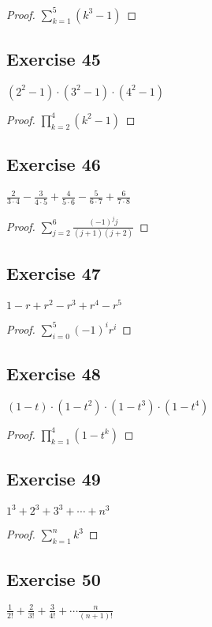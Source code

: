 \documentclass[14pt]{extarticle}
\newcommand{\dps}{\displaystyle}
\begin{document}
\begin{proof}
    $\dps\sum_{k=1}^{5}(k^3-1)$
\end{proof}

\subsection{Exercise 45}
$(2^2 - 1)\cdot(3^2 - 1)\cdot(4^2 - 1)$

\begin{proof}
    $\dps\prod_{k=2}^{4}(k^2-1)$
\end{proof}

\subsection{Exercise 46}
$\dps\frac{2}{3\cdot4} - \frac{3}{4\cdot5} + \frac{4}{5\cdot6} - \frac{5}{6\cdot7} + \frac{6}{7\cdot8}$

\begin{proof}
    $\dps\sum_{j=2}^{6}\frac{(-1)^j j}{(j+1)(j+2)}$
\end{proof}

\subsection{Exercise 47}
$1 - r + r^2 - r^3 + r^4 - r^5$

\begin{proof}
    $\dps\sum_{i = 0}^{5}(-1)^i r^i$
\end{proof}

\subsection{Exercise 48}
$(1 - t)\cdot(1 - t^2)\cdot(1 - t^3)\cdot(1 - t^4)$

\begin{proof}
    $\dps\prod_{k=1}^{4}(1-t^k)$
\end{proof}

\subsection{Exercise 49}
$1^3 + 2^3 + 3^3 + \cdots + n^3$

\begin{proof}
    $\dps\sum_{k=1}^{n}k^3$
\end{proof}

\subsection{Exercise 50}
$\dps \frac{1}{2!} + \frac{2}{3!} + \frac{3}{4!} + \cdots \frac{n}{(n+1)!}$
\end{document}
